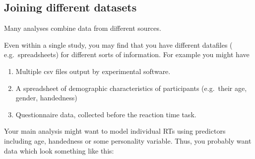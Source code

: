 \documentclass[]{article}
\newenvironment{Shaded}{\begin{snugshade}}{\end{snugshade}}
\newcommand{\KeywordTok}[1]{\textcolor[rgb]{0.13,0.29,0.53}{\textbf{#1}}}
\newcommand{\NormalTok}[1]{#1}
\newcommand{\OperatorTok}[1]{\textcolor[rgb]{0.81,0.36,0.00}{\textbf{#1}}}
\newcommand{\StringTok}[1]{\textcolor[rgb]{0.31,0.60,0.02}{#1}}
\begin{document}
\hypertarget{joining-data}{%
\subsection*{Joining different datasets}\label{joining-data}}

Many analyses combine data from different sources.

Even within a single study, you may find that you have different datafiles (
e.g.~spreadsheets) for different sorts of information. For example you might have

\begin{enumerate}
\def\labelenumi{\arabic{enumi}.}
\item
  Multiple csv files output by experimental software.
\item
  A spreadsheet of demographic characteristics of participants (e.g.~their age,
  gender, handedness)
\item
  Questionnaire data, collected before the reaction time task.
\end{enumerate}

Your main analysis might want to model individual RTs using predictors including
age, handedness or some personality variable. Thus, you probably want data which
look something like this:

\begin{Shaded}
\end{Shaded}
\end{document}
